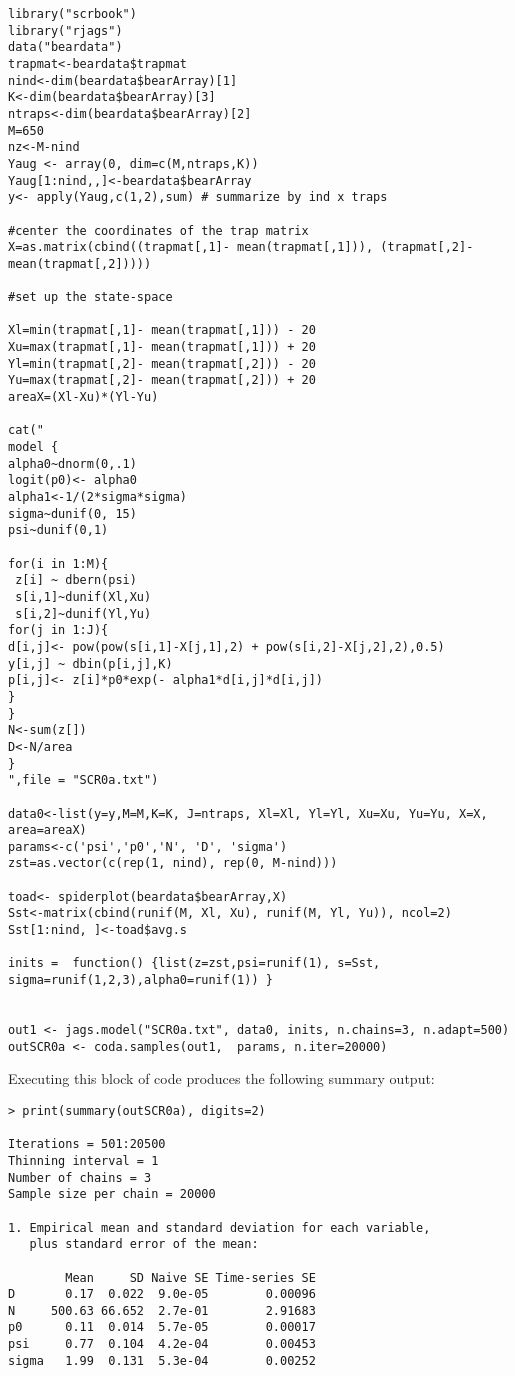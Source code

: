 {\small
\begin{verbatim}
library("scrbook")
library("rjags")
data("beardata")
trapmat<-beardata$trapmat
nind<-dim(beardata$bearArray)[1]
K<-dim(beardata$bearArray)[3]
ntraps<-dim(beardata$bearArray)[2]
M=650
nz<-M-nind
Yaug <- array(0, dim=c(M,ntraps,K))
Yaug[1:nind,,]<-beardata$bearArray
y<- apply(Yaug,c(1,2),sum) # summarize by ind x traps

#center the coordinates of the trap matrix
X=as.matrix(cbind((trapmat[,1]- mean(trapmat[,1])), (trapmat[,2]- mean(trapmat[,2]))))

#set up the state-space

Xl=min(trapmat[,1]- mean(trapmat[,1])) - 20
Xu=max(trapmat[,1]- mean(trapmat[,1])) + 20
Yl=min(trapmat[,2]- mean(trapmat[,2])) - 20
Yu=max(trapmat[,2]- mean(trapmat[,2])) + 20
areaX=(Xl-Xu)*(Yl-Yu)

cat("
model {
alpha0~dnorm(0,.1)
logit(p0)<- alpha0
alpha1<-1/(2*sigma*sigma)
sigma~dunif(0, 15)
psi~dunif(0,1)

for(i in 1:M){
 z[i] ~ dbern(psi)
 s[i,1]~dunif(Xl,Xu)
 s[i,2]~dunif(Yl,Yu)
for(j in 1:J){
d[i,j]<- pow(pow(s[i,1]-X[j,1],2) + pow(s[i,2]-X[j,2],2),0.5)
y[i,j] ~ dbin(p[i,j],K)
p[i,j]<- z[i]*p0*exp(- alpha1*d[i,j]*d[i,j])
}
}
N<-sum(z[])
D<-N/area
}
",file = "SCR0a.txt")

data0<-list(y=y,M=M,K=K, J=ntraps, Xl=Xl, Yl=Yl, Xu=Xu, Yu=Yu, X=X, area=areaX)
params<-c('psi','p0','N', 'D', 'sigma')
zst=as.vector(c(rep(1, nind), rep(0, M-nind)))

toad<- spiderplot(beardata$bearArray,X)
Sst<-matrix(cbind(runif(M, Xl, Xu), runif(M, Yl, Yu)), ncol=2)
Sst[1:nind, ]<-toad$avg.s

inits =  function() {list(z=zst,psi=runif(1), s=Sst, sigma=runif(1,2,3),alpha0=runif(1)) }


out1 <- jags.model("SCR0a.txt", data0, inits, n.chains=3, n.adapt=500)
outSCR0a <- coda.samples(out1,  params, n.iter=20000)
\end{verbatim}
}
Executing this block of code produces the following summary output:
{\small
\begin{verbatim}
> print(summary(outSCR0a), digits=2)

Iterations = 501:20500
Thinning interval = 1
Number of chains = 3
Sample size per chain = 20000

1. Empirical mean and standard deviation for each variable,
   plus standard error of the mean:

        Mean     SD Naive SE Time-series SE
D       0.17  0.022  9.0e-05        0.00096
N     500.63 66.652  2.7e-01        2.91683
p0      0.11  0.014  5.7e-05        0.00017
psi     0.77  0.104  4.2e-04        0.00453
sigma   1.99  0.131  5.3e-04        0.00252
\end{verbatim}
}
